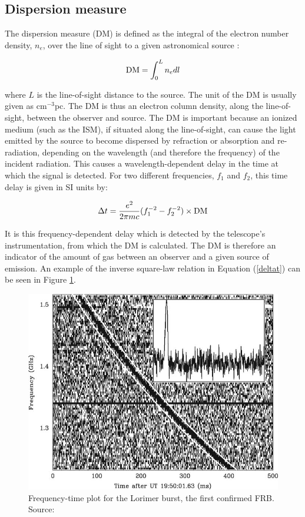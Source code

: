 \documentclass[12pt]{article}
\begin{document}
\subsection{Dispersion measure}
The dispersion measure (DM) is defined as the integral of the electron number density, $n_{e}$, over the line of sight to a given astronomical source \cite{ahuja2005tracking}:

\begin{equation}
\textnormal{DM} = \int_{0}^{L}n_{e}dl
\label{dm}
\end{equation}

where $L$ is the line-of-sight distance to the source. The unit of the DM is usually given as cm$^{-3}$pc. The DM is thus an electron column density, along the line-of-sight, between the observer and source. The DM is important because an ionized medium (such as the ISM), if situated along the line-of-sight, can cause the light emitted by the source to become dispersed by refraction or absorption and re-radiation, depending on the wavelength (and therefore the frequency) of the incident radiation. This causes a wavelength-dependent delay in the time at which the signal is detected. For two different frequencies, $f_{1}$ and $f_{2}$, this time delay is given in SI units by:

\begin{equation}
\Delta t= \frac{e^2}{2\pi mc}(f_{1}^{-2} - f_{2}^{-2}) \times \textnormal{DM}
\label{deltat}
\end{equation}

It is this frequency-dependent delay which is detected by the telescope's instrumentation, from which the DM is calculated. The DM is therefore an indicator of the amount of gas between an observer and a given source of emission. An example of the inverse square-law relation in Equation (\ref{deltat}) can be seen in Figure \ref{lorimerfrb}.

\begin{figure}[h!]
\begin{center}
\includegraphics[scale=0.4]{lorimer_freq_vs_time.png}
\caption{Frequency-time plot for the Lorimer burst, the first confirmed FRB. Source:  \cite{lorimer2007bright}}
\label{lorimerfrb}
\end{center}
\end{figure}
\end{document}
